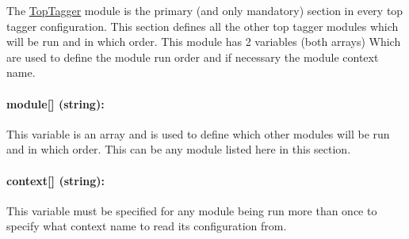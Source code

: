The \hyperlink{classTopTagger}{Top\-Tagger} module is the primary (and only mandatory) section in every top tagger configuration. This section defines all the other top tagger modules which will be run and in which order. This module has 2 variables (both arrays) Which are used to define the module run order and if necessary the module context name.

\paragraph*{module\mbox{[}\mbox{]} (string)\-:}

This variable is an array and is used to define which other modules will be run and in which order. This can be any module listed here in this section.

\paragraph*{context\mbox{[}\mbox{]} (string)\-:}

This variable must be specified for any module being run more than once to specify what context name to read its configuration from. 